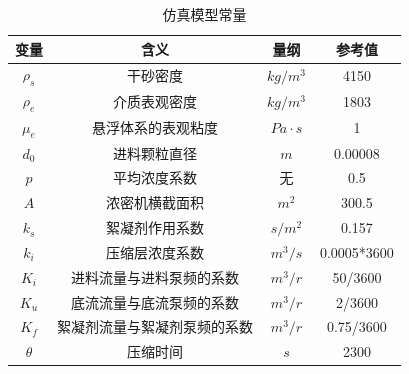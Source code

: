 \begin{table}[htb]
  \centering
\caption{仿真模型常量}
\label{tab:const_variable}
\begin{tabular}{cccc}
\toprule 变量            & 含义             & 量纲           &
参考值         \\ \midrule
$\rho _s$     & 干砂密度           & $kg/m^3$     & 4150        \\
$\rho _e$     & 介质表观密度         & $kg/m^3$     & 1803        \\
$\mu _ { e }$ & 悬浮体系的表观粘度      & $Pa \cdot s$ & 1           \\
$d_0$         & 进料颗粒直径         & $m$          & 0.00008     \\
$p$           & 平均浓度系数         & 无            & 0.5         \\
$A$           & 浓密机横截面积        & $m^2$        & 300.5       \\
$k_s$         & 絮凝剂作用系数        & $s/m^2$      & 0.157       \\
$k_i$         & 压缩层浓度系数        & $m^3/s$      & 0.0005*3600 \\
$K_i$         & 进料流量与进料泵频的系数   & $m^3/r$      & 50/3600     \\
$K_u$         & 底流流量与底流泵频的系数   & $m^3/r$      & 2/3600      \\
$K_f$         & 絮凝剂流量与絮凝剂泵频的系数 & $m^3/r$      & 0.75/3600   \\
$\theta$      & 压缩时间           & $s$          & 2300        \\
\bottomrule
\end{tabular}
\end{table}
